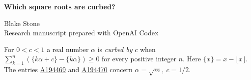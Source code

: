 \documentclass[11pt,letterpaper]{article}
\newcommand{\oeis}[1]{\href{https://oeis.org/A#1}{A#1}}
\begin{document}
\thispagestyle{plain}
\begin{center}
{\LARGE\bfseries Which square roots are curbed?\par}
\vspace{0.5em}
Blake Stone\\
{\small Research manuscript prepared with OpenAI Codex}
\end{center}

\begin{abstract}
Kimberling asked whether infinitely many nonsquare radicands satisfy his fractional-part inequalities and infinitely many fail. A theorem of Boshernitzan and Ralston supplies an exact continued-fraction test. We apply it to prove that the successful radicands have density zero and that at least \((\tfrac12+o(1))\sqrt X\log X\) successful nonsquares lie below \(X\). We also locate a repeated entry in the published complement.
\end{abstract}

For \(0<c<1\) a real number \(\alpha\) is \emph{curbed by} \(c\) when
\(\sum_{k=1}^n(\{k\alpha+c\}-\{k\alpha\})\ge0\) for every positive integer \(n\). Here \(\{x\}=x-\lfloor x\rfloor\). The entries \oeis{194469} and \oeis{194470} concern \(\alpha=\sqrt m,\ c=1/2\).
\end{document}
